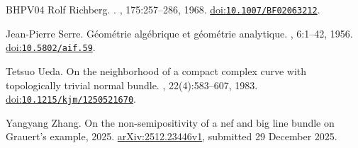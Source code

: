 \documentclass[11pt,a4paper]{article}
\numberwithin{equation}{section}
\theoremstyle{definition}
\theoremstyle{remark}
\begin{document}
\begin{thebibliography}{BHPV04}
Rolf Richberg.
.
, 175:257--286, 1968.
\newblock \href{https://doi.org/10.1007/BF02063212}{doi:\nolinkurl{10.1007/BF02063212}}.

Jean-Pierre Serre.
\newblock G{\'e}om{\'e}trie alg{\'e}brique et g{\'e}om{\'e}trie analytique.
, 6:1--42, 1956.
\newblock \href{https://doi.org/10.5802/aif.59}{doi:\nolinkurl{10.5802/aif.59}}.

Tetsuo Ueda.
\newblock On the neighborhood of a compact complex curve with topologically trivial normal bundle.
, 22(4):583--607, 1983.
\newblock \href{https://doi.org/10.1215/kjm/1250521670}{doi:\nolinkurl{10.1215/kjm/1250521670}}.

Yangyang Zhang.
\newblock On the non-semipositivity of a nef and big line bundle on {Grauert's} example, 2025.
\newblock \href{https://arxiv.org/abs/2512.23446v1}{arXiv:2512.23446v1}, submitted 29 December 2025.

\end{thebibliography}
\end{document}
